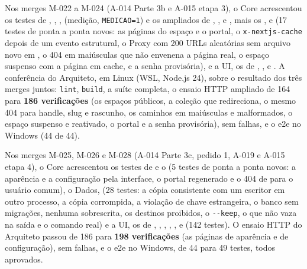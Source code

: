 Nos merges M-022 a M-024 (A-014 Parte 3b e A-015 etapa 3), o Core acrescentou os testes de , , ,  (medição, \texttt{MEDICAO=1}) e os ampliados de , ,  e , mais os  ,  e  (17 testes de ponta a ponta novos: as páginas do espaço e o portal, o \texttt{x-nextjs-cache} depois de um evento estrutural, o Proxy com 200 URLs aleatórias sem arquivo novo em , o 404 em maiúsculas que não envenena a página real, o espaço suspenso com a página em cache, e a senha provisória), e a UI, os de , ,  e . A conferência do Arquiteto, em Linux (WSL, Node.js 24), sobre o resultado dos três merges juntos: \texttt{lint}, \texttt{build}, a suíte completa, o ensaio HTTP ampliado de 164 para \textbf{186 verificações} (os espaços públicos, a coleção que redireciona, o mesmo 404 para handle, slug e rascunho, os caminhos em maiúsculas e malformados, o espaço suspenso e reativado, o portal e a senha provisória), sem falhas, e o e2e no Windows (44 de 44).

Nos merges M-025, M-026 e M-028 (A-014 Parte 3c, pedido 1, A-019 e A-015 etapa 4), o Core acrescentou os testes de  e o   (5 testes de ponta a ponta novos: a aparência e a configuração pela interface, o portal regenerado e o 404 de  para o usuário comum), o Dados,  (28 testes: a cópia consistente com um escritor em outro processo, a cópia corrompida, a violação de chave estrangeira, o banco sem migrações, nenhuma sobrescrita, os destinos proibidos, o \texttt{-{}-keep}, o que não vaza na saída e o comando real) e a UI, os de , , , , ,  e  (142 testes). O ensaio HTTP do Arquiteto passou de 186 para \textbf{198 verificações} (as páginas de aparência e de configuração), sem falhas, e o e2e no Windows, de 44 para 49 testes, todos aprovados.

